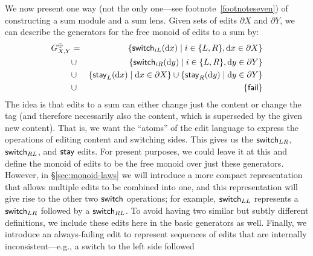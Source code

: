 We now present one way (not the only one---see footnote~\ref{footnoteseven})
of constructing a sum module and a sum lens.
\iflater
{}\fi
Given sets of edits $\partial X$ and $\partial Y$, we can describe
the generators for the free monoid of edits to a sum by:
\begin{eqnarray*}
    G^\oplus_{X,Y}
    &=&    \{\mathsf{switch}_{iL}(\textrm{d} x) \mid i \in \{L,R\}, \textrm{d} x \in \partial X\} \\
    &\cup& \{\mathsf{switch}_{iR}(\textrm{d} y) \mid i \in \{L,R\}, \textrm{d} y \in \partial Y\} \\
    &\cup& \{\mathsf{stay}_L(\textrm{d} x) \mid \textrm{d} x \in \partial X\} \cup \{\mathsf{stay}_R(\textrm{d} y) \mid \textrm{d} y \in \partial Y\} \\
    &\cup& \{\mathsf{fail}\}
\end{eqnarray*}
The idea is that edits to a sum can either change just the
content or change the tag (and therefore necessarily also the content, which
is superseded by the given new content).  That is, we want the ``atoms'' of
the edit language to express the operations of editing content and switching
sides.  This gives us the $\mathsf{switch}_{LR}$, $\mathsf{switch}_{RL}$, and $\mathsf{stay}$ edits.
%
For present purposes, we could leave it at this and define the monoid of edits to be the free 
monoid over just these generators.  However, in 
\S\ref{sec:monoid-laws} we will introduce a more compact
representation that allows multiple edits to be combined into one, and this
representation will give rise to the other two $\mathsf{switch}$ operations; for example,
$\mathsf{switch}_{LL}$ represents a $\mathsf{switch}_{LR}$ followed by a
$\mathsf{switch}_{RL}$.  To avoid having two similar but subtly different
definitions, we include these edits here in the basic generators as well.
%
Finally, we introduce an always-failing edit to represent sequences of edits
that are internally inconsistent---e.g., a switch to the left side followed
